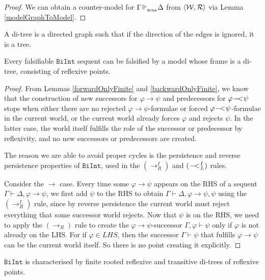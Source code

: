 \documentclass{llncs}
\numberwithin{equation}{section}
\newcommand{\pair}[2]{\langle #1, #2\rangle}
\newcommand{\Lg}[1]{\mathtt{#1}}
\newcommand{\ExImp}{\rightarrow}
\newcommand{\sequent}{\vdash}
\newcommand{\Imp}{\rightarrow}
\newcommand{\WeakImp}{
\begin{picture}(10,10)
     \put(1,0){$-$}
     \put(7,0){$<$}
   \end{picture}
   \;\; 
}
\newcommand{\mycal}[1]{
        {\cal{#1}}
}
\newcommand {\BiInt}{
        \Lg{BiInt}
}
\newcommand{\ImpRightRule}{({\Imp_R})}
\newcommand{\ImpRightRuleI}{({\Imp_R^I})}
\newcommand{\WeakImpLeftRuleI}{({\WeakImp_L^I})}
\newcommand{\entails}{\hspace{-0.05cm}\Vdash_{_{\BiInt}}\hspace{-0.1cm}}
\begin{document}
\begin{proof}
\noindent We can obtain a counter-model for $\Gamma \entails \Delta$ from $\pair{\mycal{W}}{\mycal{R}}$ via Lemma \ref{modelGraphToModel}.
\end{proof}

\begin{definition}
A di-tree is a directed graph such that if the direction of the edges is ignored, it is a tree.
\end{definition}

\begin{theorem}
Every falsifiable $\BiInt$ sequent can be falsified by a model whose frame is a di-tree, consisting of reflexive points.
\end{theorem}
\begin{proof}
From Lemmas \ref{forwardOnlyFinite} and \ref{backwardOnlyFinite}, we know that the construction of new successors for $\varphi \ExImp \psi$ and predecessors for $\varphi \WeakImp \psi$ stops when either there are no rejected $\varphi \ExImp \psi$-formulae or forced $\varphi \WeakImp \psi$-formulae in the current world, or the current world already forces $\varphi$ and rejects $\psi$. In the latter case, the world itself fulfills the role of the successor or predecessor by reflexivity, and no new successors or predecessors are created.

The reason we are able to avoid proper cycles is the persistence and reverse persistence properties of $\BiInt$, used in the $\ImpRightRuleI$ and $\WeakImpLeftRuleI$ rules.

Consider the $\ExImp$ case. Every time some $\varphi \ExImp \psi$ appears on the RHS of a sequent $\Gamma \sequent \Delta, \varphi \ExImp \psi$, we first add $\psi$ to the RHS to obtain $\Gamma \sequent \Delta, \varphi \ExImp \psi, \psi$ using the $\ImpRightRuleI$ rule, since by reverse persistence the current world must reject everything that some successor world rejects. Now that $\psi$ is on the RHS, we need to apply the $\ImpRightRule$ rule to create the $\varphi \ExImp \psi$-successor $\Gamma, \varphi \sequent \psi$ only if $\varphi$ is not already on the LHS. For if $\varphi \in LHS$, then the successor $\Gamma \sequent \psi$ that fulfills $\varphi \ExImp \psi$ can be the current world itself. So there is no point creating it explicitly.
\end{proof}

\begin{corollary}
$\BiInt$ is characterised by finite rooted reflexive and transitive di-trees of reflexive points.
\end{corollary}
\end{document}
